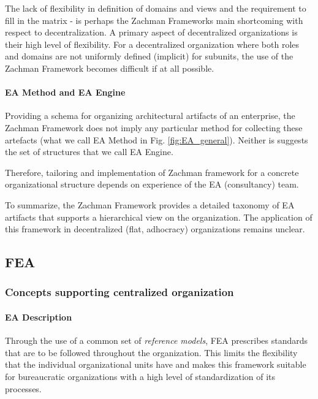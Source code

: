 The lack of flexibility in definition of domains and views and the requirement to fill in the matrix - is perhaps the Zachman Frameworks main shortcoming with respect to decentralization. A primary aspect of decentralized organizations is their high level of flexibility. For a decentralized organization where both roles and domains are not uniformly defined (implicit) for subunits, the use of the Zachman Framework becomes difficult if at all possible.


\paragraph*{EA Method and EA Engine}

Providing a schema for organizing architectural artifacts of an enterprise, the Zachman Framework does not imply any particular method for collecting these artefacts (what we call EA Method in Fig. \ref{fig:EA_general}).
Neither is suggests the set of structures that we call EA Engine. 

Therefore, tailoring and  implementation of Zachman framework for a concrete organizational structure depends on experience of the EA (consultancy) team.

To summarize, the Zachman Framework provides a detailed taxonomy of EA artifacts that supports a hierarchical view on the organization. The application of this framework in decentralized (flat, adhocracy) organizations remains unclear.

\subsection{FEA}
\subsubsection{Concepts supporting centralized organization}
\paragraph*{EA Description}
Through the use of a common set of \textit{reference models}, FEA prescribes standards that are to be followed throughout the organization. This limits the flexibility that the individual organizational units have and makes this framework suitable for bureaucratic organizations with a high level of standardization of its processes.

